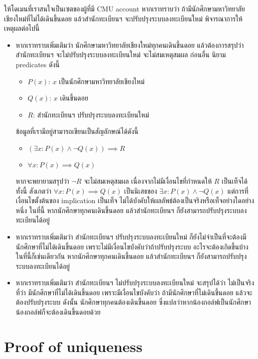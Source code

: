 \begin{example}
ให้โดเมนที่เราสนใจเป็นเซตของผู้ที่มี CMU account \enskip หากเราทราบว่า ถ้ามีนักศึกษามหาวิทยาลัยเชียงใหม่ที่ไม่ได้เดินขึ้นดอย แล้วสำนักทะเบียนฯ จะปรับปรุงระบบลงทะเบียนใหม่ พิจารณาการให้เหตุผลต่อไปนี้
\begin{itemize}
\item หากเราทราบเพิ่มเติมว่า นักศึกษามหาวิทยาลัยเชียงใหม่ทุกคนเดินขึ้นดอย แล้วต้องการสรุปว่า สำนักทะเบียนฯ จะไม่ปรับปรุงระบบลงทะเบียนใหม่ จะไม่สมเหตุสมผล \enskip ก่อนอื่น นิยาม predicates ดังนี้
\begin{itemize}
\item $P(x)$: $x$ เป็นนักศึกษามหาวิทยาลัยเชียงใหม่
\item $Q(x)$: $x$ เดินขึ้นดอย
\item $R$: สำนักทะเบียนฯ ปรับปรุงระบบลงทะเบียนใหม่
\end{itemize}
ข้อมูลที่เรามีอยู่สามารถเขียนเป็นสัญลักษณ์ได้ดังนี้
\begin{itemize}
\item $(\exists x: P(x)\wedge\neg Q(x))\implies R$
\item $\forall x: P(x)\implies Q(x)$
\end{itemize}
หากจะพยายามสรุปว่า $\neg R$ จะไม่สมเหตุสมผล เนื่องจากไม่มีเงื่อนไขที่กำหนดให้ $R$ เป็นเท็จได้ \enskip ทั้งนี้ สังเกตว่า $\forall x: P(x)\implies Q(x)$ เป็นนิเสธของ $\exists x: P(x)\wedge\neg Q(x)$ แต่การที่เงื่อนไขตั้งต้นของ implication เป็นเท็จ ไม่ได้บังคับให้ผลลัพธ์ต้องเป็นจริงหรือเท็จอย่างใดอย่างหนึ่ง \enskip ในที่นี้ หากนักศึกษาทุกคนเดินขึ้นดอย แล้วสำนักทะเบียนฯ ก็ยังสามารถปรับปรุงระบบลงทะเบียนได้อยู่

\item หากเราทราบเพิ่มเติมว่า สำนักทะเบียนฯ ปรับปรุงระบบลงทะเบียนใหม่ ก็ยังไม่จำเป็นที่จะต้องมีนักศึกษาที่ไม่ได้เดินขึ้นดอย เพราะไม่มีเงื่อนไขบังคับว่าถ้าปรับปรุงระบบ อะไรจะต้องเกิดขึ้นบ้าง \enskip ในที่นี้ก็เช่นเดียวกัน หากนักศึกษาทุกคนเดินขึ้นดอย แล้วสำนักทะเบียนฯ ก็ยังสามารถปรับปรุงระบบลงทะเบียนได้อยู่

\item หากเราทราบเพิ่มเติมว่า สำนักทะเบียนฯ ไม่ปรับปรุงระบบลงทะเบียนใหม่ จะสรุปได้ว่า ไม่เป็นจริงที่ว่า มีนักศึกษาที่ไม่ได้เดินขึ้นดอย เพราะมีเงื่อนไขบังคับว่า ถ้ามีนักศึกษาที่ไม่เดินขึ้นดอย แล้วจะต้องปรับปรุงระบบ \enskip ดังนั้น นักศึกษาทุกคนต้องเดินขึ้นดอย ซึ่งแปลว่าหากน้องกอล์ฟเป็นนักศึกษา น้องกอล์ฟก็จะต้องเดินขึ้นดอยด้วย
\end{itemize}
\end{example}

\section{Proof of uniqueness}

